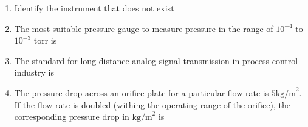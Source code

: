 \documentclass[journal,12pt,onecolumn]{IEEEtran}
\theoremstyle{remark}
\begin{document}
\begin{enumerate}
\item Identify the instrument that does not exist \par \hfill{}
\begin{enumerate}
\end{enumerate}

\item The most suitable pressure gauge to measure pressure in the range of $10^{-4}$ to $10^{-3}$ torr is  \par \hfill{}
\begin{enumerate}
\end{enumerate}

\item The standard for long distance analog signal transmission in process control industry is \par \hfill{}
\begin{enumerate}
\end{enumerate}

\item The pressure drop across an orifice plate for a particular flow rate is $5\text{kg/m}^2$. If the flow rate is doubled (withing the operating range of the orifice), the corresponding pressure drop in $\text{kg/m}^2$ is \par \hfill{}
\begin{enumerate}
\end{enumerate}


\end{enumerate}
\end{document}
